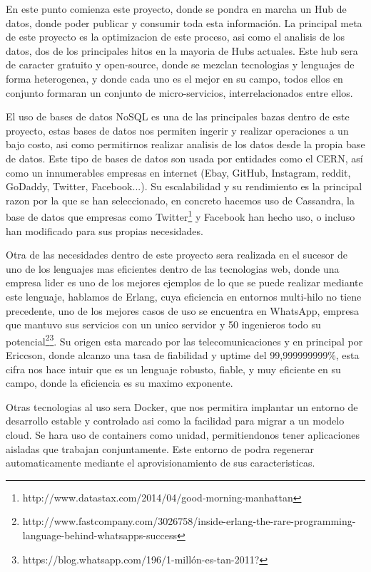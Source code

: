 \documentclass{pre-tfg}
\begin{document}
En este punto comienza este proyecto, donde se pondra en marcha un Hub de datos, donde poder publicar y consumir toda esta información. La
principal meta de este proyecto es la optimizacion de este proceso, asi como el analisis de los datos, dos de los principales hitos en la
mayoria de Hubs actuales. Este hub sera de caracter gratuito y open-source, donde se mezclan tecnologias y lenguajes de forma
heterogenea, y donde cada uno es el mejor en su campo, todos ellos en conjunto formaran un conjunto de micro-servicios, interrelacionados
entre ellos.

El uso de bases de datos NoSQL es una de las principales bazas dentro
de este proyecto, estas bases de datos nos permiten ingerir y realizar
operaciones a un bajo costo, asi como permitirnos realizar analisis de
los datos desde la propia base de datos. Este tipo de bases de datos son usada por entidades como el CERN, así como un innumerables empresas en internet (Ebay, GitHub, Instagram, reddit, GoDaddy, Twitter, Facebook...). Su escalabilidad y su
rendimiento es la principal razon por la que se han seleccionado, en
concreto hacemos uso de Cassandra, la base de datos que empresas como
Twitter\footnote{http://www.datastax.com/2014/04/good-morning-manhattan}
y Facebook han hecho uso, o incluso han modificado para sus propias
necesidades.

Otra de las necesidades dentro de este proyecto sera realizada en el
sucesor de uno de los lenguajes mas eficientes dentro de las
tecnologias web, donde una empresa lider es uno de los mejores
ejemplos de lo que se puede realizar mediante este lenguaje, hablamos
de Erlang, cuya eficiencia en entornos multi-hilo no tiene precedente,
uno de los mejores casos de uso se encuentra en WhatsApp, empresa que
mantuvo sus servicios con un unico servidor y 50 ingenieros todo su
potencial\footnote{http://www.fastcompany.com/3026758/inside-erlang-the-rare-programming-language-behind-whatsapps-success}\footnote{https://blog.whatsapp.com/196/1-millón-es-tan-2011?}. Su origen esta marcado por las telecomunicaciones y en
principal por Ericcson, donde alcanzo una tasa de fiabilidad y uptime
del 99,999999999\%, esta cifra nos hace intuir que es un lenguaje robusto, fiable, y muy eficiente en su campo, donde la eficiencia es su maximo exponente.

Otras tecnologias al uso sera Docker, que nos permitira implantar un
entorno de desarrollo estable y controlado asi como la facilidad para migrar a un modelo cloud.
Se hara uso de containers como unidad, permitiendonos tener
aplicaciones aisladas que trabajan conjuntamente. Este entorno de
podra regenerar automaticamente mediante el aprovisionamiento de sus caracteristicas.
\end{document}
